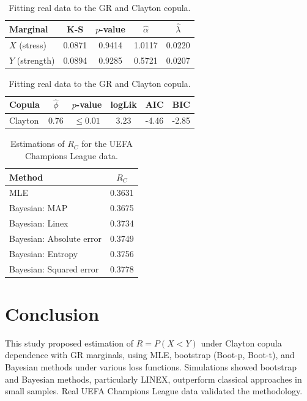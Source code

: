 \documentclass[twoside]{article}
\begin{document}
\begin{table}[H]
	\centering
	\caption{Fitting real data to the GR and Clayton copula.}
	\label{tab-fit}
	\footnotesize
	\begin{tabular}{lcccc}
		\toprule
		Marginal & K-S & $p$-value & $\widehat{\alpha}$ & $\widehat{\lambda}$ \\
		\midrule
		$X$ (stress) & 0.0871 & 0.9414 & 1.0117 & 0.0220 \\
		$Y$ (strength) & 0.0894 & 0.9285 & 0.5721 & 0.0207 \\
		\bottomrule
	\end{tabular}
	\quad
	\begin{tabular}{lccccc}
		\toprule
		Copula & $\widehat{\phi}$ & $p$-value & logLik & AIC & BIC \\
		\midrule
		Clayton & 0.76 & $\leq 0.01$ & 3.23 & -4.46 & -2.85 \\
		\bottomrule
	\end{tabular}
\end{table}

\begin{table}[H]
	\centering
	\caption{Estimations of $R_C$ for the UEFA Champions League data.}
	\label{estim-R-real}
	\footnotesize
	\begin{tabular}{lc}
		\hline
		Method & $R_C$ \\
		\hline
		MLE & 0.3631 \\
		Bayesian: MAP & 0.3675 \\
		Bayesian: Linex & 0.3734 \\
		Bayesian: Absolute error & 0.3749 \\
		Bayesian: Entropy & 0.3756 \\
		Bayesian: Squared error & 0.3778 \\
		\hline
	\end{tabular}
\end{table}
\section{Conclusion}

This study proposed estimation of $R = P(X < Y)$ under Clayton copula dependence with GR marginals, using MLE, bootstrap (Boot-p, Boot-t), and Bayesian methods under various loss functions. Simulations showed bootstrap and Bayesian methods, particularly LINEX, outperform classical approaches in small samples. Real UEFA Champions League data validated the methodology.
\end{document}
